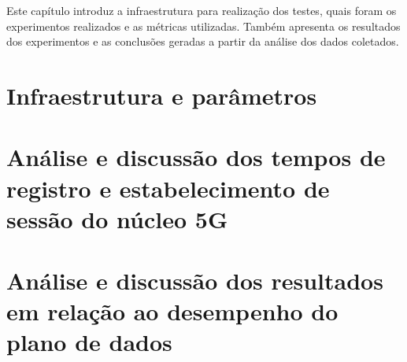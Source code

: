 Este capítulo introduz a infraestrutura para realização dos testes, quais foram os experimentos realizados e as métricas utilizadas. Também apresenta os resultados dos experimentos e as conclusões geradas a partir da análise dos dados coletados.

\section{Infraestrutura e parâmetros}


\section{Análise e discussão dos tempos de registro e estabelecimento de sessão do núcleo 5G}


\section{Análise e discussão dos resultados em relação ao desempenho do plano de dados}


% 



